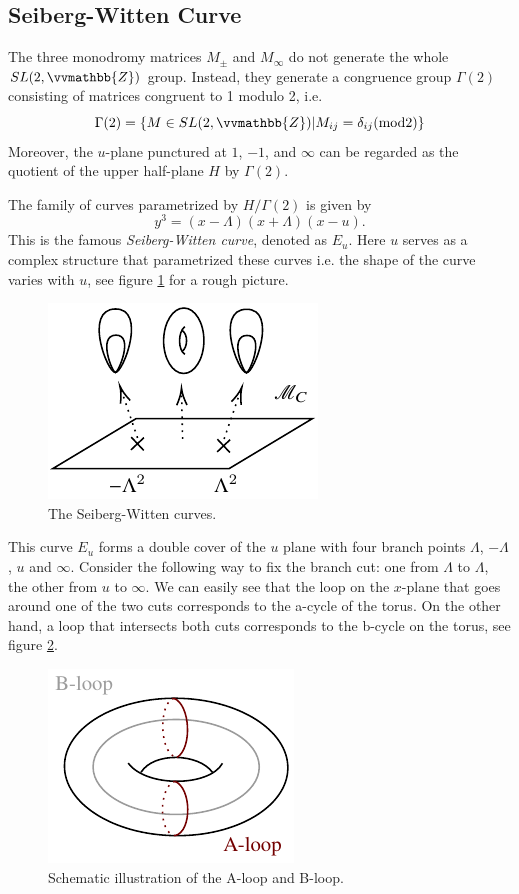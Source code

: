 \documentclass{article}
\begin{document}
\subsection{Seiberg-Witten Curve}
The three monodromy matrices $M_{\pm}$ and $M_\infty$ do not generate the whole $SL(2,\vvmathbb{Z})$ group. Instead, they generate a congruence group $\Gamma(2)$  consisting of matrices congruent to 1 modulo 2, i.e.
\begin{equation}
    \Gamma(2)=\{M\in SL(2,\vvmathbb{Z}) | M_{ij} = \delta_{ij} (\mathrm{mod} 2) \}
\end{equation}
Moreover, the $u$-plane punctured at $1$, $-1$, and $\infty$ can be regarded as the quotient of the upper half-plane $H$ by $\Gamma(2)$.

The family of curves parametrized by $H/\Gamma(2)$ is given by 
\begin{equation}
    y^3=(x-\Lambda)(x+\Lambda)(x-u).
\end{equation}
This is the famous \textit{Seiberg-Witten curve}, denoted as $E_u$. Here $u$ serves as a complex structure that parametrized these curves i.e. the shape of the curve varies with $u$, see figure \ref{fig:swcurve} for a rough picture.

\begin{figure}[htbp]
\centering
\includegraphics{swcurve.pdf}
\caption{The Seiberg-Witten curves.}
\label{fig:swcurve}
\end{figure}

This curve $E_u$ forms a double cover of the $u$ plane with four branch points $\Lambda$, $-\Lambda$, $u$ and $\infty$. Consider the following way to fix the branch cut: one from $\Lambda$ to $\Lambda$, the other from $u$ to $\infty$. We can easily see that the loop on the $x$-plane that goes around one of the two cuts corresponds to the a-cycle of the torus. On the other hand, a loop that intersects both cuts corresponds to the b-cycle on the torus, see figure \ref{fig:loop}. 

\begin{figure}[htbp]
\centering
\includegraphics{loop.pdf}
\caption{Schematic illustration of the A-loop and B-loop.}
\label{fig:loop}
\end{figure}
\end{document}
